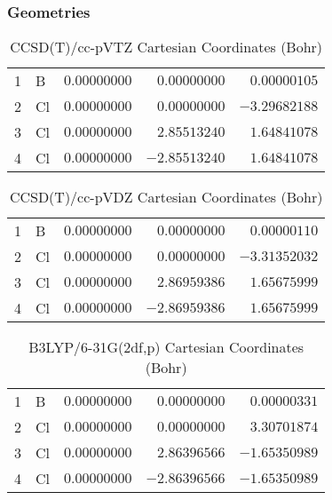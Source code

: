 \documentclass[10pt,oneside]{article}
\begin{document}
\clearpage

\subsection{\ \ \ }

\subsubsection*{Geometries}
\begin{table}[h!]
\centering
\caption{CCSD(T)/cc-pVTZ Cartesian Coordinates (Bohr)}
\begin{tabular}{llrrr}
1  & B  & $ 0.00000000$ & $ 0.00000000$ & $ 0.00000105$ \\
2  & Cl & $ 0.00000000$ & $ 0.00000000$ & $-3.29682188$ \\
3  & Cl & $ 0.00000000$ & $ 2.85513240$ & $ 1.64841078$ \\
4  & Cl & $ 0.00000000$ & $-2.85513240$ & $ 1.64841078$ \\
\end{tabular}
\end{table}

\begin{table}[h!]
\centering
\caption{CCSD(T)/cc-pVDZ Cartesian Coordinates (Bohr)}
\begin{tabular}{llrrr}
1  & B  & $ 0.00000000$ & $ 0.00000000$ & $ 0.00000110$ \\
2  & Cl & $ 0.00000000$ & $ 0.00000000$ & $-3.31352032$ \\
3  & Cl & $ 0.00000000$ & $ 2.86959386$ & $ 1.65675999$ \\
4  & Cl & $ 0.00000000$ & $-2.86959386$ & $ 1.65675999$ \\
\end{tabular}
\end{table}

\begin{table}[h!]
\centering
\caption{B3LYP/6-31G(2df,p) Cartesian Coordinates (Bohr)}
\begin{tabular}{llrrr}
1  & B  & $ 0.00000000$ & $ 0.00000000$ & $ 0.00000331$ \\
2  & Cl & $ 0.00000000$ & $ 0.00000000$ & $ 3.30701874$ \\
3  & Cl & $ 0.00000000$ & $ 2.86396566$ & $-1.65350989$ \\
4  & Cl & $ 0.00000000$ & $-2.86396566$ & $-1.65350989$ \\
\end{tabular}
\end{table}
\end{document}
